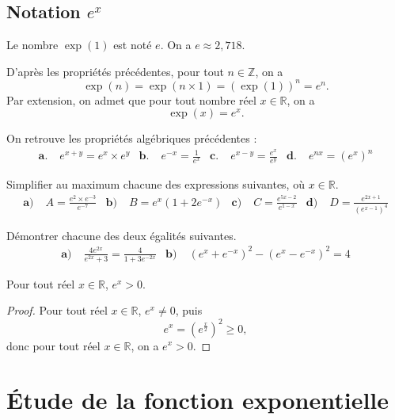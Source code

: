 \documentclass[11pt]{article}
\begin{document}
\subsection{Notation $e^x$}
\begin{notation}
  Le nombre $\exp(1)$ est noté $e$. On a $e\approx2,718$.
\end{notation}
\begin{propadm}
  D'après les propriétés précédentes, pour tout $n\in\mathbb{Z}$, on a
  \[
    \exp(n) = \exp(n\times1) = (\exp(1))^n = e^n.
  \]
  Par extension, on admet que pour tout nombre réel $x\in\mathbb{R}$, on a
  \[
    \exp(x) = e^x.
  \]
\end{propadm}
\begin{prop}
On retrouve les propriétés algébriques précédentes :
  \begin{align*}
    \textbf{a.}\;& e^{x+y} = e^x\times e^y &
    \textbf{b.}\;& e^{-x} = \frac{1}{e^x} &
    \textbf{c.}\;& e^{x-y} = \frac{e^x}{e^y} &
    \textbf{d.}\;& e^{nx} = \left( e^x \right)^n 
  \end{align*}
\end{prop}

\begin{app}
  Simplifier au maximum chacune des expressions suivantes, où $x\in\mathbb{R}$.
  \begin{align*}
    \textbf{a)}\;& A = \frac{e^2\times e^{-3}}{e^{-7}} &
    \textbf{b)}\;& B = e^x\left( 1+2e^{-x} \right) &
    \textbf{c)}\;& C = \frac{e^{5x-2}}{e^{1-x}} &
    \textbf{d)}\;& D = \frac{e^{2x+1}}{\left( e^{x-1} \right)^{4}}
  \end{align*}
\end{app}
\begin{app}
  Démontrer chacune des deux égalités suivantes.
  \begin{align*}
    \textbf{a)}\;& \frac{4e^{2x}}{e^{2x}+3} = \frac{4}{1+3e^{-2x}} &
    \textbf{b)}\;& \left( e^x+e^{-x} \right)^2-\left( e^x-e^{-x} \right)^2 = 4
  \end{align*}
\end{app}
\begin{prop}
  Pour tout réel $x\in\mathbb{R}$, $e^x>0$.
\end{prop}
\begin{proof}
  Pour tout réel $x\in\mathbb{R}$, $e^x\neq0$, puis
  \[
    e^x = \left( e^{\frac{x}{2}} \right)^2\geq0,
  \]
  donc pour tout réel $x\in\mathbb{R}$, on a $e^x>0$.
\end{proof}

\section{Étude de la fonction exponentielle}
\end{document}

